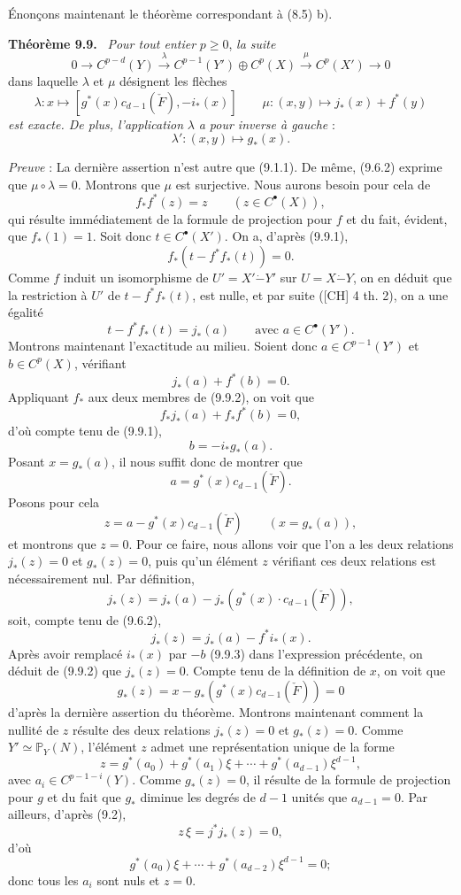 \documentclass[11pt]{article}
\newenvironment{statement}[1]{\par\medskip\noindent\textbf{#1.}\ }{\par\medskip}
\begin{document}
Énonçons maintenant le théorème correspondant à (8.5) b).

\begin{statement}{Théorème 9.9}
\emph{Pour tout entier} $p\ge0$, \emph{la suite}
\[
0\to C^{p-d}(Y)\xrightarrow{\lambda} C^{p-1}(Y')\oplus C^p(X)\xrightarrow{\mu} C^p(X')\to0
\]
dans laquelle $\lambda$ et $\mu$ désignent les flèches
\[
\lambda:x\mapsto[g^*(x)c_{d-1}(\check F),-i_*(x)]
\qquad
\mu:(x,y)\mapsto j_*(x)+f^*(y)
\]
\emph{est exacte. De plus, l'application} $\lambda$ \emph{a pour inverse à gauche} :
\[
\lambda':(x,y)\mapsto g_*(x).
\]
\end{statement}

\emph{Preuve} : La dernière assertion n'est autre que (9.1.1). De même, (9.6.2) exprime que $\mu\circ\lambda=0$. Montrons que $\mu$ est surjective. Nous aurons besoin pour cela de
\[
f_*f^*(z)=z\qquad(z\in C^{\bullet}(X)),
\tag{9.9.1}
\]
qui résulte immédiatement de la formule de projection pour $f$ et du fait, évident, que $f_*(1)=1$. Soit donc $t\in C^{\bullet}(X')$. On a, d'après (9.9.1),
\[
f_*(t-f^*f_*(t))=0.
\]
Comme $f$ induit un isomorphisme de $U'=X'\mathbin{\dot{-}}Y'$ sur $U=X\mathbin{\dot{-}}Y$, on en déduit que la
restriction à $U'$ de $t-f^*f_*(t)$, est nulle, et par suite ([CH] 4 th. 2), on a une égalité
\[
t-f^*f_*(t)=j_*(a)
\qquad\text{avec }a\in C^{\bullet}(Y').
\]
Montrons maintenant l'exactitude au milieu. Soient donc $a\in C^{p-1}(Y')$ et $b\in C^p(X)$, vérifiant
\[
j_*(a)+f^*(b)=0.
\tag{9.9.2}
\]
Appliquant $f_*$ aux deux membres de (9.9.2), on voit que
\[
f_*j_*(a)+f_*f^*(b)=0,
\]
d'où compte tenu de (9.9.1),
\[
b=-i_*g_*(a).
\tag{9.9.3}
\]
Posant $x=g_*(a)$, il nous suffit donc de montrer que
\[
a=g^*(x)c_{d-1}(\check F).
\tag{9.9.4}
\]
Posons pour cela
\[
z=a-g^*(x)c_{d-1}(\check F)\qquad(x=g_*(a)),
\]
et montrons que $z=0$. Pour ce faire, nous allons voir que l'on a les deux relations $j_*(z)=0$ et $g_*(z)=0$, puis qu'un élément $z$ vérifiant ces deux relations est nécessairement nul. Par définition,
\[
j_*(z)=j_*(a)-j_*(g^*(x)\cdot c_{d-1}(\check F)),
\]
soit, compte tenu de (9.6.2),
\[
j_*(z)=j_*(a)-f^*i_*(x).
\]
Après avoir remplacé $i_*(x)$ par $-b$ (9.9.3) dans l'expression précédente, on déduit de (9.9.2) que $j_*(z)=0$. Compte tenu de la définition de $x$, on voit que
\[
g_*(z)=x-g_*(g^*(x)c_{d-1}(\check F))=0
\]
d'après la dernière assertion du théorème. Montrons maintenant comment la nullité 
de $z$
résulte des deux relations $j_*(z)=0$ et $g_*(z)=0$. Comme $Y'\simeq\mathbb P_Y(N)$, l'élément $z$ admet une représentation unique de la forme
\[
z=g^*(a_0)+g^*(a_1)\xi+\cdots+g^*(a_{d-1})\xi^{d-1},
\]
avec $a_i\in C^{p-1-i}(Y)$. Comme $g_*(z)=0$, il résulte de la formule de projection pour $g$ et du fait que $g_*$ diminue les degrés de $d-1$ unités que $a_{d-1}=0$. Par ailleurs, d'après (9.2),
\[
z\,\xi=j^*j_*(z)=0,
\]
d'où
\[
g^*(a_0)\xi+\cdots+g^*(a_{d-2})\xi^{d-1}=0;
\]
donc tous les $a_i$ sont nuls et $z=0$.
\end{document}
